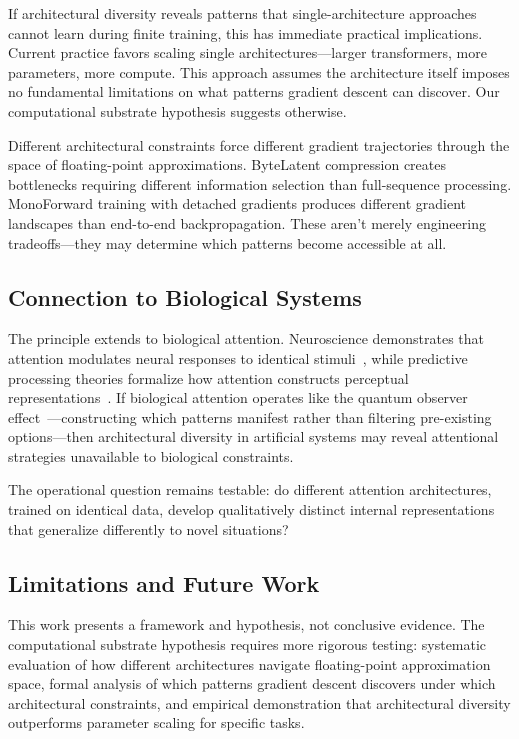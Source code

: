 \documentclass{article}
\begin{document}
If architectural diversity reveals patterns that single-architecture approaches cannot learn during finite training, this has immediate practical implications. Current practice favors scaling single architectures—larger transformers, more parameters, more compute. This approach assumes the architecture itself imposes no fundamental limitations on what patterns gradient descent can discover. Our computational substrate hypothesis suggests otherwise.

Different architectural constraints force different gradient trajectories through the space of floating-point approximations. ByteLatent compression creates bottlenecks requiring different information selection than full-sequence processing. MonoForward training with detached gradients produces different gradient landscapes than end-to-end backpropagation. These aren't merely engineering tradeoffs—they may determine which patterns become accessible at all.

\subsection{Connection to Biological Systems}

The principle extends to biological attention. Neuroscience demonstrates that attention modulates neural responses to identical stimuli~\cite{treue1996attentional,kastner2000mechanisms}, while predictive processing theories formalize how attention constructs perceptual representations~\cite{friston2010free,clark2013whatever}. If biological attention operates like the quantum observer effect~\cite{heisenberg1927uncertainty}—constructing which patterns manifest rather than filtering pre-existing options—then architectural diversity in artificial systems may reveal attentional strategies unavailable to biological constraints.

The operational question remains testable: do different attention architectures, trained on identical data, develop qualitatively distinct internal representations that generalize differently to novel situations?

\subsection{Limitations and Future Work}

This work presents a framework and hypothesis, not conclusive evidence. The computational substrate hypothesis requires more rigorous testing: systematic evaluation of how different architectures navigate floating-point approximation space, formal analysis of which patterns gradient descent discovers under which architectural constraints, and empirical demonstration that architectural diversity outperforms parameter scaling for specific tasks.
\end{document}
